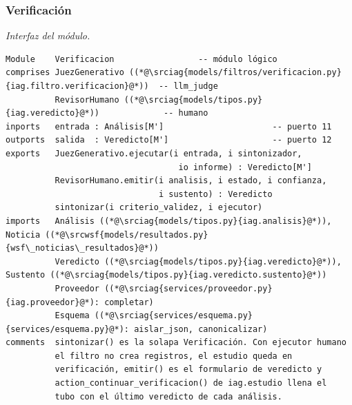 \documentclass[12pt]{report}
\newcommand{\wsfrepo}{https://github.com/wsf/wsfnoticias}
\newcommand{\wsfref}{aa59c466581c0ce83c16f88f63d6021e9039fbcd}
\newcommand{\srcwsf}[2]{\href{\wsfrepo/blob/\wsfref/#1}{#2}}
\newcommand{\iagrepo}{https://github.com/lbassani12/noticias_iag}
\newcommand{\iagref}{bca7dba0bc76cf5533bd8df1d9a27493d498942d}
\newcommand{\srciag}[2]{\href{\iagrepo/blob/\iagref/#1}{#2}}
\begin{document}
\subsubsection{Verificación}
\label{sec:impl-mat-verificacion}

\noindent\begin{minipage}{\linewidth}
  \textit{Interfaz del módulo.}
  \begin{lstlisting}[style=implbloque]
Module    Verificacion                 -- módulo lógico
comprises JuezGenerativo ((*@\srciag{models/filtros/verificacion.py}{iag.filtro.verificacion}@*))  -- llm_judge
          RevisorHumano ((*@\srciag{models/tipos.py}{iag.veredicto}@*))             -- humano
inports   entrada : Análisis[M']                      -- puerto 11
outports  salida  : Veredicto[M']                     -- puerto 12
exports   JuezGenerativo.ejecutar(i entrada, i sintonizador,
                                   io informe) : Veredicto[M']
          RevisorHumano.emitir(i analisis, i estado, i confianza,
                               i sustento) : Veredicto
          sintonizar(i criterio_validez, i ejecutor)
imports   Análisis ((*@\srciag{models/tipos.py}{iag.analisis}@*)), Noticia ((*@\srcwsf{models/resultados.py}{wsf\_noticias\_resultados}@*))
          Veredicto ((*@\srciag{models/tipos.py}{iag.veredicto}@*)), Sustento ((*@\srciag{models/tipos.py}{iag.veredicto.sustento}@*))
          Proveedor ((*@\srciag{services/proveedor.py}{iag.proveedor}@*): completar)
          Esquema ((*@\srciag{services/esquema.py}{services/esquema.py}@*): aislar_json, canonicalizar)
comments  sintonizar() es la solapa Verificación. Con ejecutor humano
          el filtro no crea registros, el estudio queda en
          verificación, emitir() es el formulario de veredicto y
          action_continuar_verificacion() de iag.estudio llena el
          tubo con el último veredicto de cada análisis.
\end{lstlisting}
\end{minipage}
\end{document}
